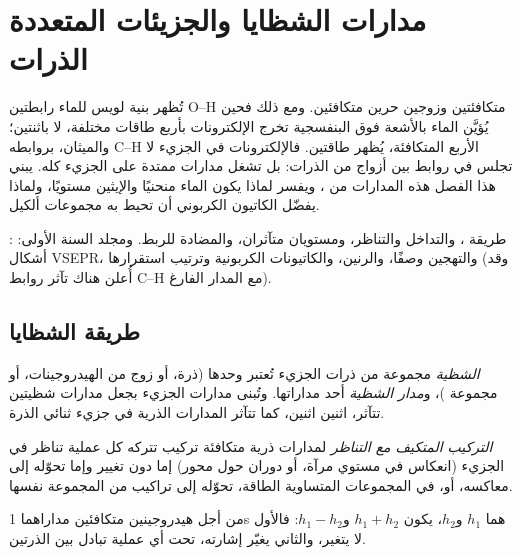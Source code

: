\chapter{مدارات الشظايا والجزيئات المتعددة الذرات}\label{ch:b2:fragment-orbitals}

تُظهر بنية لويس للماء رابطتين O--H متكافئتين وزوجين حرين
متكافئين. ومع ذلك فحين يُؤيَّن الماء بالأشعة فوق البنفسجية تخرج
الإلكترونات بأربع طاقات مختلفة، لا باثنتين؛ والميثان، بروابطه C--H الأربع
المتكافئة، يُظهر طاقتين. فالإلكترونات في الجزيء لا تجلس في روابط
بين أزواج من الذرات: بل تشغل مدارات ممتدة على الجزيء كله.
يبني هذا الفصل هذه المدارات من ، ويفسر
لماذا يكون الماء منحنيًا والإيثين مستويًا، ولماذا يفضّل الكاتيون الكربوني أن تحيط به
مجموعات ألكيل.

\begin{recall}
: طريقة ، والتداخل والتناظر، ومستويان متآثران،
 والمضادة للربط. ومجلد السنة الأولى: أشكال VSEPR، والتهجين
وصفًا، والرنين، والكاتيونات الكربونية وترتيب استقرارها (وقد أُعلن هناك
تآثر روابط C--H مع المدار الفارغ).
\end{recall}

\section{طريقة الشظايا}

\begin{definition}[الشظايا]\label{def:b2:fragment-orbitals:fragment}
\emph{الشظية} مجموعة من ذرات الجزيء تُعتبر
وحدها (ذرة، أو زوج من الهيدروجينات، أو مجموعة )، و\emph{مدار
الشظية} أحد مداراتها. وتُبنى مدارات
الجزيء بجعل مدارات شظيتين تتآثر، اثنين
اثنين، كما تتآثر المدارات الذرية في جزيء ثنائي الذرة.
\end{definition}

\begin{definition}\label{def:b2:fragment-orbitals:symmetry-adapted}
\emph{التركيب المتكيف مع التناظر} لمدارات ذرية
متكافئة تركيب تتركه كل عملية تناظر في
الجزيء (انعكاس في مستوي مرآة، أو دوران حول محور) إما
دون تغيير وإما تحوّله إلى معاكسه، أو، في المجموعات المتساوية الطاقة، تحوّله
إلى تراكيب من المجموعة نفسها.
\end{definition}

\begin{proposition}[هيدروجينان]\label{prop:b2:fragment-orbitals:h2-pair}
من أجل هيدروجينين متكافئين مداراهما 1s هما $h_1$ و$h_2$، يكون
 $h_1 + h_2$ و$h_1 - h_2$: فالأول لا
يتغير، والثاني يغيّر إشارته، تحت أي عملية تبادل بين
الذرتين.
\end{proposition}

